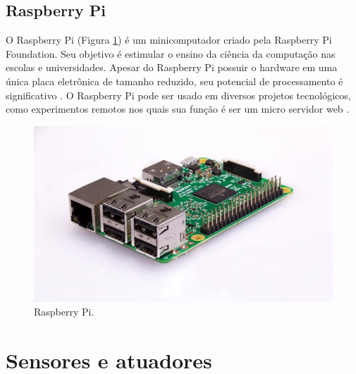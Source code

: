 %
%


\subsection{Raspberry Pi}

O Raspberry Pi (Figura \ref{fig:rpi}) é um minicomputador criado pela Raspberry Pi Foundation. Seu objetivo é estimular o ensino da ciência da computação nas escolas e universidades. Apesar do Raspberry Pi possuir o hardware em uma única placa eletrônica de tamanho reduzido, seu potencial de processamento é significativo \cite{crotti2013raspberrypi}. O Raspberry Pi pode ser usado em diversos projetos tecnológicos, como experimentos remotos nos quais sua função é ser um micro servidor web \cite{crotti2013raspberrypi}.

\begin{figure}[htbp]
		\centering
		\includegraphics[scale=0.2]{figuras/raspberrypi.jpg}
		\caption{Raspberry Pi.}
		\label{fig:rpi}
\end{figure}

\section{Sensores e atuadores}

